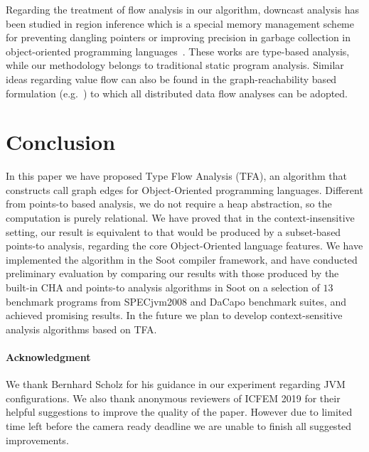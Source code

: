 \documentclass[runningheads]{llncs}
\begin{document}
Regarding the treatment of flow analysis in our algorithm, downcast analysis has been studied in region inference which is a special memory management scheme for preventing dangling pointers or improving precision in garbage collection in object-oriented programming languages~\cite{Boyapati2003,Chin2004}.  These works are type-based analysis, while our methodology belongs to traditional static program analysis. Similar ideas regarding value flow can also be found in the graph-reachability based formulation (e.g.~\cite{Reps1997,Lu2013}) to which all distributed data flow analyses can be adopted.

\section{Conclusion}\label{sec:conclusion}

In this paper we have proposed Type Flow Analysis (TFA), an algorithm that constructs call graph edges for Object-Oriented programming languages. Different from points-to based analysis, we do not require a heap abstraction, so the computation is purely relational. We have proved that in the context-insensitive setting, our result is equivalent to that would be produced by a subset-based points-to analysis, regarding the core Object-Oriented language features. We have implemented the algorithm in the Soot compiler framework, and have conducted preliminary evaluation by comparing our results with those produced by the built-in CHA and points-to analysis algorithms in Soot on a selection of $13$ benchmark programs from SPECjvm2008 and DaCapo benchmark suites, and achieved promising results. In the future we plan to develop context-sensitive analysis algorithms based on TFA.

\paragraph{Acknowledgment}

We thank Bernhard Scholz for his guidance in our experiment regarding JVM configurations. We also thank anonymous reviewers of ICFEM 2019 for their helpful suggestions to improve the quality of the paper. However due to limited time left before the camera ready deadline we are unable to finish all suggested improvements.



\end{document}
